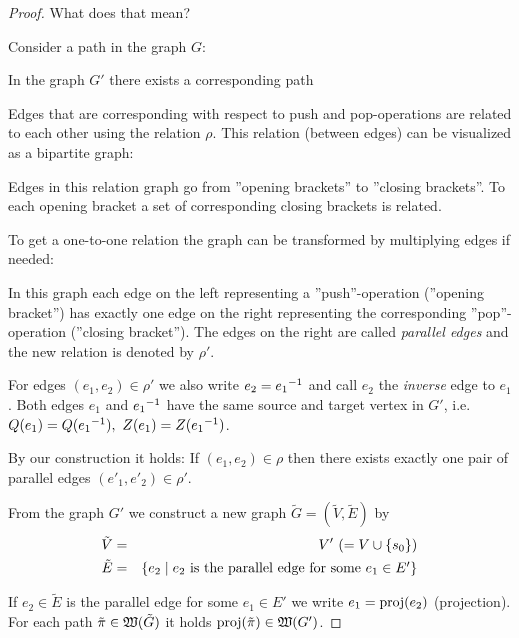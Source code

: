 \begin{proof}
What does that mean?

Consider a path in the graph $G$:

\begin{center}

\end{center}

In the graph $G'$ there exists a corresponding path

\begin{center}

\end{center}

Edges that are corresponding with respect to push and pop-operations are related
to each other using the relation $\rho$. This relation (between edges) can be
visualized as a bipartite graph:

\missingfigure

Edges in this relation graph go from ''opening brackets'' to ''closing
brackets''. To each opening bracket a set of corresponding closing brackets is
related. 

To get a one-to-one relation the graph can be transformed by multiplying edges
if needed:

\missingfigure

In this graph each edge on the left representing a ''push''-operation
(''opening bracket'') has exactly one edge on the right representing the
corresponding ''pop''-operation (''closing bracket''). The edges on the right
are called {\em parallel edges} and the new relation is denoted by $\rho'$.

For edges $(e_1, e_2) \in \rho'$ we also write $e_2 = \mbox{${e_1}^{-1}$}$ and call $e_2$
the {\em inverse} edge to $e_1$. Both edges $e_1$ and $\mbox{${e_1}^{-1}$}$ have the same
source and target vertex in $G'$, i.e.\ $Q(e_1) = Q(\mbox{${e_1}^{-1}$}),\ Z(e_1) =
Z(\mbox{${e_1}^{-1}$})$.

By our construction it holds: If $(e_1, e_2) \in \rho$ then there exists exactly
one pair of parallel edges $(e'_1, e'_2)  \in \rho'$.

From the graph $G'$ we construct a new graph $\tilde{G} = (\tilde{V},
\tilde{E})$ by
\begin{eqnarray*}
\tilde{V} &=& V' \ (=V \cup \mbox{$\{s_0\}$}) \\
\tilde{E} &=& \mbox{$\{e_2 \mid e_2\text{ is the parallel edge for some $e_1 \in
E'$}\}$}
\end{eqnarray*}

If $e_2 \in \tilde{E}$ is the parallel edge for some $e_1 \in E'$ we write $e_1
= \mathrm{proj}({e_2})$ (projection). For each path $\tilde{\pi} \in \mbox{$\mathfrak{W}({\tilde{G}})$}$ it
holds $\mathrm{proj}({\tilde{\pi}}) \in \mbox{$\mathfrak{W}({G'})$}$.


\end{proof}
